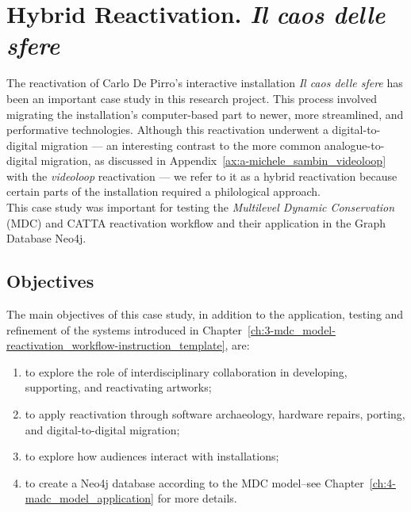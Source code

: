 \chapter{\label{ax:b-hybrid_reactivation_il_caos_delle_sfere}Hybrid Reactivation. \textit{Il caos delle sfere}}

The reactivation of Carlo De Pirro’s interactive installation \textit{Il caos delle sfere} has been an important case study in this research project. This process involved migrating the installation’s computer-based part to newer, more streamlined, and performative technologies. Although this reactivation underwent a digital-to-digital migration — an interesting contrast to the more common analogue-to-digital migration, as discussed in Appendix~\ref{ax:a-michele_sambin_videoloop} with the \textit{videoloop} reactivation — we refer to it as a hybrid reactivation because certain parts of the installation required a philological approach.\\
This case study was important for testing the \textit{Multilevel Dynamic Conservation} (MDC) and CATTA reactivation workflow and their application in the Graph Database Neo4j.

\section{Objectives}
The main objectives of this case study, in addition to the application, testing and refinement of the systems introduced in Chapter~\ref{ch:3-mdc_model-reactivation_workflow-instruction_template}, are:
\begin{enumerate}
    \item to explore the role of interdisciplinary collaboration in developing, supporting, and reactivating artworks;
    \item to apply reactivation through software archaeology, hardware repairs, porting, and digital-to-digital migration;
    \item to explore how audiences interact with installations;
    \item to create a Neo4j database according to the MDC model–see Chapter~\ref{ch:4-madc_model_application} for more details.
\end{enumerate}

